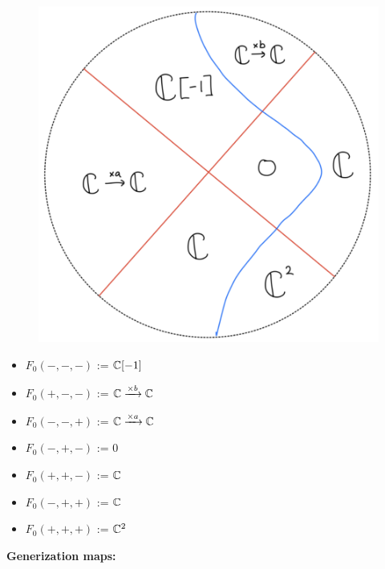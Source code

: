 \begin{figure}[H]
    \centering
    \includegraphics[scale = 0.45]{diagrams/lemma4/20.png}
    \caption{}
    \label{fig:your-label}
\end{figure}
\begin{itemize}
\item $F_0(-,-,-)$ := $\mathbb{C}[-1]$
\item $F_0(+,-,-)$ := $\mathbb{C} \xrightarrow{\times b} \mathbb{C} $
\item $F_0(-,-,+)$ := $\mathbb{C} \xrightarrow{\times a} \mathbb{C} $
\item $F_0(-,+,-)$ := $0$
\item $F_0(+,+,-)$ := $\mathbb{C}$
\item $F_0(-,+,+)$ := $\mathbb{C}$
\item $F_0(+,+,+)$ := $\mathbb{C}^2$
\end{itemize}
\textbf{Generization maps:}
